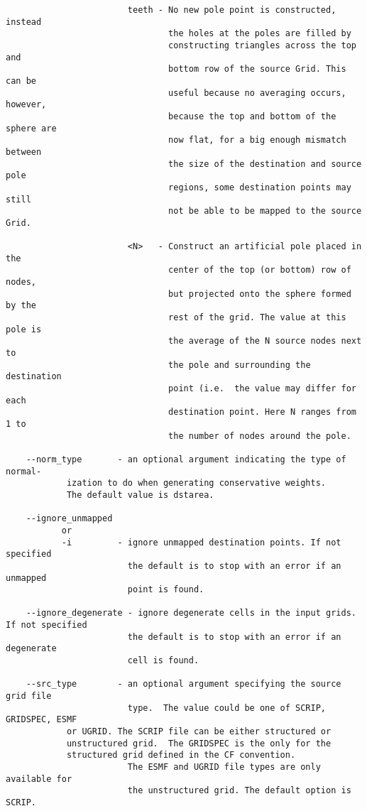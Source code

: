 \begin{verbatim}
                        teeth - No new pole point is constructed, instead
                                the holes at the poles are filled by
                                constructing triangles across the top and
                                bottom row of the source Grid. This can be
                                useful because no averaging occurs, however,
                                because the top and bottom of the sphere are
                                now flat, for a big enough mismatch between
                                the size of the destination and source pole
                                regions, some destination points may still
                                not be able to be mapped to the source Grid.

                        <N>   - Construct an artificial pole placed in the
                                center of the top (or bottom) row of nodes,
                                but projected onto the sphere formed by the
                                rest of the grid. The value at this pole is
                                the average of the N source nodes next to
                                the pole and surrounding the destination
                                point (i.e.  the value may differ for each
                                destination point. Here N ranges from 1 to
                                the number of nodes around the pole.

    --norm_type       - an optional argument indicating the type of normal-
			ization to do when generating conservative weights. 
			The default value is dstarea.

    --ignore_unmapped
           or
           -i         - ignore unmapped destination points. If not specified
                        the default is to stop with an error if an unmapped
                        point is found.

    --ignore_degenerate - ignore degenerate cells in the input grids. If not specified
                        the default is to stop with an error if an degenerate
                        cell is found.

    --src_type        - an optional argument specifying the source grid file
                        type.  The value could be one of SCRIP, GRIDSPEC, ESMF
			or UGRID. The SCRIP file can be either structured or
 			unstructured grid.  The GRIDSPEC is the only for the
			structured grid defined in the CF convention.
                        The ESMF and UGRID file types are only available for
                        the unstructured grid. The default option is SCRIP.


\end{verbatim}
